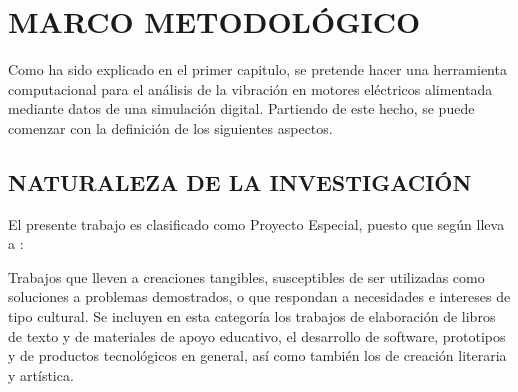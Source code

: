 \thispagestyle{empty}

	\section{MARCO METODOLÓGICO}



Como ha sido explicado en el primer capitulo, se pretende hacer una herramienta computacional para el análisis de la vibración en motores eléctricos alimentada mediante datos de una simulación digital. Partiendo de este hecho, se puede comenzar con la definición de los siguientes aspectos.\\


\subsection{NATURALEZA DE LA INVESTIGACIÓN}

El presente trabajo es clasificado como Proyecto Especial, puesto que según  \textcite{Hernandez} lleva a :\\
\begin{center}
	\parbox[ht]{13.5 cm}{Trabajos que lleven a creaciones tangibles, susceptibles de ser utilizadas como soluciones a problemas demostrados, o que respondan a necesidades e intereses de tipo cultural. Se incluyen en esta categoría los trabajos de elaboración de libros de texto y de materiales de apoyo educativo, el desarrollo de software, prototipos y de productos tecnológicos en general, así como también los de creación literaria y artística.}
\end{center}


